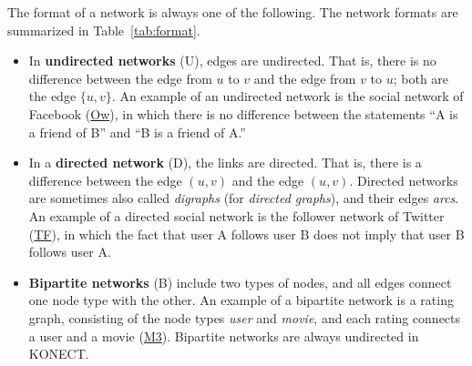 \documentclass{article}
\begin{document}
The format of a network is always one of the following.  The network
formats are summarized in Table~\ref{tab:format}. 
\begin{itemize}
\item 
  In \textbf{undirected networks} (U), 
  edges are undirected.  That is,
  there is no difference between the edge from $u$ to $v$ and the edge
  from $v$ to $u$; both are the edge $\{u,v\}$. 
  An example of an undirected network is the social network of
  Facebook
  (\href{http://konect.uni-koblenz.de/networks/facebook-wosn-wall}{\textsf{Ow}}),
  in which there is no difference between the statements ``A 
  is a friend of B'' and ``B is a friend of A.''
\item In a \textbf{directed network} (D), 
  the links are directed. That is, there is a
  difference between the edge $(u,v)$ and the edge $(u,v)$. 
  Directed networks are sometimes also called \emph{digraphs} (for \emph{directed
    graphs}), and their edges \emph{arcs}. 
  An example of a directed social network is the follower network of
  Twitter
  (\href{http://konect.uni-koblenz.de/networks/twitter_mpi}{\textsf{TF}}),
  in which the fact that user A follows user B does not imply 
  that user B follows user A. 
\item \textbf{Bipartite networks} (B) 
  include two types of nodes, and all edges
  connect one node type with the other. An example of a bipartite
  network is a rating graph, consisting of the node types \emph{user}
  and \emph{movie}, and each rating connects a user and a movie
  (\href{http://konect.uni-koblenz.de/networks/movielens-10m_rating}{\textsf{M3}}).  
  Bipartite networks are always undirected in KONECT. 
\end{itemize}

\begin{table}
  \caption{
    The network formats allowed in KONECT.
    Each network dataset is exactly of one type.  
    \label{tab:format}
  }
  \centering
{}
\end{table}
\end{document}
